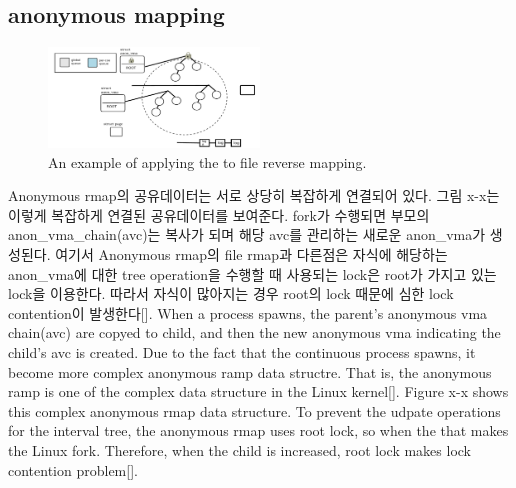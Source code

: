 \subsection{anonymous mapping}


\begin{figure}[tb]
  \begin{center}
     \includegraphics[width=0.5\textwidth,height=0.5\textheight,keepaspectratio]{fig/anon_vma}
  \end{center}
  \caption{An example of applying the  to file reverse mapping. }
  \label{fig:deferu2}
\end{figure}

\ifkor
Anonymous rmap의 공유데이터는 서로 상당히 복잡하게 연결되어 있다. 
그림 x-x는 이렇게 복잡하게 연결된 공유데이터를 보여준다.
fork가 수행되면 부모의 anon\_vma\_chain(avc)는 복사가 되며 해당 avc를 관리하는 새로운 anon\_vma가 생성된다. 
여기서 Anonymous rmap의 file rmap과 다른점은 자식에 해당하는 anon\_vma에 대한 tree operation을
수행할 때 사용되는 lock은 root가 가지고 있는 lock을 이용한다. 
따라서 자식이 많아지는 경우 root의 lock 때문에 심한 lock contention이 발생한다[].
\else
When a process spawns, the parent's anonymous vma chain(avc) are copyed to
child, and then the new anonymous vma indicating the child's avc is created.
Due to the fact that the continuous process spawns, it become more complex
anonymous ramp data structre.
That is, the anonymous ramp is one of the complex data structure in the Linux
kernel[].
Figure x-x shows this complex anonymous rmap data structure.
To prevent the udpate operations for the interval tree, the anonymous rmap
uses root lock, so when the that makes the Linux fork.
Therefore, when the child is increased, root lock makes lock contention
problem[].
\fi


